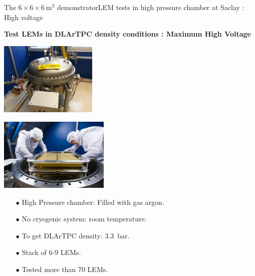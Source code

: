 \documentclass[10pt]{beamer}
\begin{document}
    \begin{frame}{The \texorpdfstring{$6 \times 6 \times \SI{6}{\meter\cubed}$}{666} demonstrator}{LEM tests in high pressure chamber at Saclay : High voltage}
    	\begin{scriptsize}
    		\begin{center}\textbf{Test LEMs in DLArTPC density conditions : Maximum High Voltage}\end{center}
	    	\begin{minipage}{0.48\textwidth}
	    		\includegraphics[height=3.5cm]{figures/666/gamelle.jpg}
	    	\end{minipage}\hfill
	    	\begin{minipage}{0.48\textwidth}
	    		\includegraphics[height=3.5cm]{figures/666/6lems_gamelle.jpg}
	    	\end{minipage}
	    	\begin{itemize}
	    		\item[$\bullet$] High Pressure chamber: Filled with gas argon.
	    		\item[$\bullet$] No cryogenic system: room temperature.
	    		\item[$\bullet$] To get DLArTPC density: \SI{3.3}{\bar}.
	    		\item[$\bullet$] Stack of 6-9 LEMs.
	    		\item[$\bullet$] Tested more than 70 LEMs.
	    	\end{itemize}
	    \end{scriptsize} 
    \end{frame}
    
\end{document}
